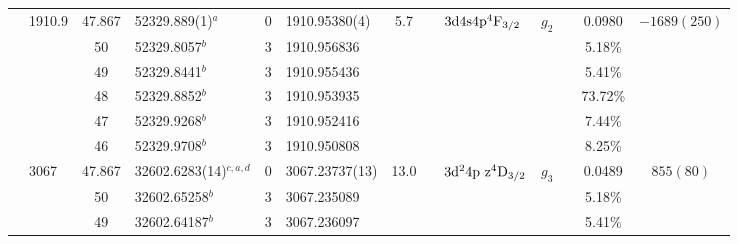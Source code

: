 \begin{table*}
\begin{center}
{\begin{tabular}{:l;l;c;l;c;l;c;l;l;c;c;c;c}
                                  & 1910.9 & 47.867    & 52329.889(1)$^{a}$               & 0 &    1910.95380(4)   &  5.7 & $                                        $ & $3\rm{d}4\rm{s}4\rm{p}^4\rm{F}_{3/2}     $ & $g_{2} $ &              & 0.0980    & $-1689(250)$\\
\rowstyle{\itshape}               &        & 50        & 52329.8057$^{b}$                 & 3 &   1910.956836      &      & $                                        $ & $                                        $ & $      $ &              & 5.18\%    & $          $\\
\rowstyle{\itshape}               &        & 49        & 52329.8441$^{b}$                 & 3 &   1910.955436      &      & $                                        $ & $                                        $ & $      $ &              & 5.41\%    & $          $\\
\rowstyle{\itshape}               &        & 48        & 52329.8852$^{b}$                 & 3 &   1910.953935      &      & $                                        $ & $                                        $ & $      $ &              & 73.72\%   & $          $\\
\rowstyle{\itshape}               &        & 47        & 52329.9268$^{b}$                 & 3 &   1910.952416      &      & $                                        $ & $                                        $ & $      $ &              & 7.44\%    & $          $\\
\rowstyle{\itshape}               &        & 46        & 52329.9708$^{b}$                 & 3 &   1910.950808      &      & $                                        $ & $                                        $ & $      $ &              & 8.25\%    & $          $\\
                                  & 3067   & 47.867    & 32602.6283(14)$^{c,a,d}$         & 0 &    3067.23737(13)  & 13.0 & $                                        $ & $3\rm{d}^24\rm{p~z}^4\rm{D}_{3/2}        $ & $g_{3} $ &              & 0.0489    & $  855(80) $\\
\rowstyle{\itshape}               &        & 50        & 32602.65258$^{b}$                & 3 &   3067.235089      &      & $                                        $ & $                                        $ & $      $ &              & 5.18\%    & $          $\\
\rowstyle{\itshape}               &        & 49        & 32602.64187$^{b}$                & 3 &   3067.236097      &      & $                                        $ & $                                        $ & $      $ &              & 5.41\%    & $          $\\

\end{tabular}}
\end{center}
\end{table*}
